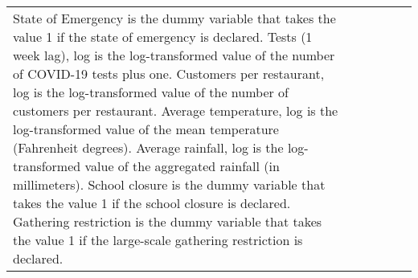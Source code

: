 \begin{table}[!htbp]
\begin{tabular}{@{\extracolsep{1pt}}lccccc}
{{State of Emergency is the dummy variable that takes the value 1 if the state of emergency is declared. 
Tests (1 week lag), log is the log-transformed value of the number of COVID-19 tests plus one.
Customers per restaurant, log is the log-transformed value of the number of customers per restaurant.
Average temperature, log is the log-transformed value of the mean temperature (Fahrenheit degrees).
Average rainfall, log is the log-transformed value of the aggregated rainfall (in millimeters).
School closure is the dummy variable that takes the value 1 if the school closure is declared. 
Gathering restriction is the dummy variable that takes the value 1 if the large-scale gathering restriction is declared.}} \\
\end{tabular} 
\end{table} 
